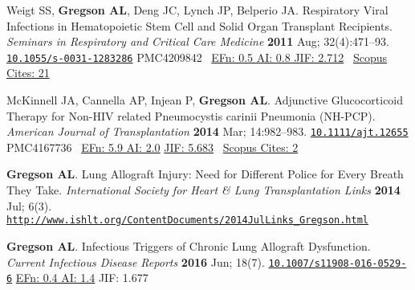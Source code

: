 \documentclass[letterpaper,11pt,sans,final]{/usr/local/share/texmf-dist/tex/latex/moderncv/moderncv}%
\begin{document}
\begin{thebibliography}{1}
  \bibitem[4]{} Weigt SS, \textbf{Gregson AL}, Deng JC, Lynch JP, Belperio JA. Respiratory Viral Infections in Hematopoietic Stem Cell and Solid Organ Transplant Recipients. {\color{BrickRed}\textit{Seminars in Respiratory and Critical Care Medicine}} \textbf{2011} Aug; 32(4):471--93. \href{http://dx.doi.org/10.1055/s-0031-1283286}{\nolinkurl{10.1055/s-0031-1283286}} {\smaller PMC4209842}~ 
    {\color{NavyBlue} \href{http://www.eigenfactor.org/rankings.php?search=SEMINARS+IN+RESPIRATORY+AND+CRITICAL+CARE+MEDICINE&search2=&search3=&searchby=journal}{{\smaller EFn: 0.5 AI: 0.8 JIF: 2.712}}~
      \href{http://www.scopus.com/record/display.uri?eid=2-s2.0-80051960857&origin=resultslist&sort=plf-f&src=s&nlo=1&nlr=20&nls=&sid=4E3F003C86CD3B740CA1877B02032D8B.y7ESLndDIsN8cE7qwvy6w%3a3832&sot=anl&sdt=aut&sl=36&s=AU-ID%28%22Gregson%2c+Aric+L.%22+6603096521%29&relpos=10&citeCnt=21&searchTerm=AU-ID%28%5C%26quot%3BGregson%2C+Aric+L.%5C%26quot%3B+6603096521%29}{{\smaller Scopus Cites: 21}}
      }

  \bibitem[5]{} McKinnell JA, Cannella AP, Injean P, \textbf{Gregson AL}. Adjunctive Glucocorticoid Therapy for Non-{\smaller HIV} related Pneumocystis carinii Pneumonia ({\smaller NH-PCP}).
{\color{BrickRed}\textit{American Journal of Transplantation}} \textbf{2014} Mar; 14:982--983. \href{http://dx.doi.org/10.1111/ajt.12655}{\nolinkurl{10.1111/ajt.12655}} {\smaller PMC4167736}~
       {\color{NavyBlue}\href{http://52.6.43.8/projects/journalRank/rankings.php?bsearch=AMERICAN+JOURNAL+OF+TRANSPLANTATION&searchby=journal&orderby=eigenfactor}{{\smaller EFn: 5.9 AI: 2.0}} 
       \href{http://admin-apps.webofknowledge.com/JCR/JCR?RQ=RECORD&rank=1&journal=AM+J+TRANSPLANT}{{\smaller JIF: 5.683}}~
       \href{http://www.scopus.com/record/display.uri?eid=2-s2.0-84897116000&origin=resultslist&sort=plf-f&src=s&st1=&st2=&nlo=1&nlr=20&nls=&sid=4E3F003C86CD3B740CA1877B02032D8B.y7ESLndDIsN8cE7qwvy6w%3a2832&sot=anl&sdt=aut&sl=36&s=AU-ID%28%22Gregson%2c+Aric+L.%22+6603096521%29&relpos=4&citeCnt=2&searchTerm=AU-ID%28%5C%26quot%3BGregson%2C+Aric+L.%5C%26quot%3B+6603096521%29}{{\smaller Scopus Cites: 2}}
       }

  \bibitem[6]{} \textbf{Gregson AL}. Lung Allograft Injury: Need for Different Police for Every Breath They Take.
{\color{BrickRed}\textit{International Society for Heart \& Lung Transplantation Links}} \textbf{2014} Jul; 6(3). \href{http://www.ishlt.org/ContentDocuments/2014JulLinks_Gregson.html}{\nolinkurl{http://www.ishlt.org/ContentDocuments/2014JulLinks_Gregson.html}}

  \bibitem[7]{} \textbf{Gregson AL}. Infectious Triggers of Chronic Lung Allograft Dysfunction. {\color{BrickRed}\textit{Current Infectious Disease Reports}} \textbf{2016} Jun; 18(7). \href{}{\nolinkurl{10.1007/s11908-016-0529-6}}
{\color{NavyBlue}\href{http://52.6.43.8/projects/journalRank/rankings.php?bsearch=Current+Infectious+Disease+Reports&searchby=journal&orderby=eigenfactor}{{\smaller EFn: 0.4  AI: 1.4}}
       {\smaller JIF: 1.677}~
       }



\end{thebibliography}
\end{document}
